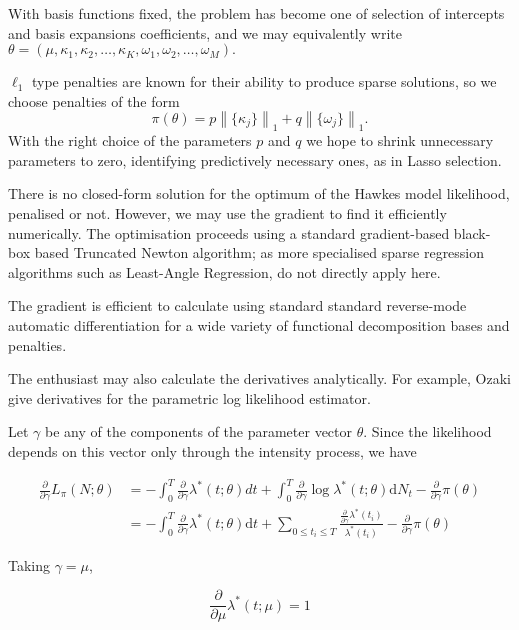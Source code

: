 \documentclass[11pt]{article}
\newcommand{\dd}{\mathrm{d}}
\begin{document}
    With basis functions fixed, the problem has become one of selection of
intercepts and basis expansions coefficients, and we may equivalently
write
\(\theta=(\mu, \kappa_1,\kappa_2,\dots,\kappa_K,\omega_1, \omega_2,\dots,\omega_M).\)

\(\ell_1\) type penalties are known for their ability to produce sparse
solutions, so we choose penalties of the form
\[\pi(\theta)=p\left\|\{\kappa_j\}\right\|_1+q\left\|\{\omega_j\}\right\|_1.\]
With the right choice of the parameters \(p\) and \(q\) we hope to
shrink unnecessary parameters to zero, identifying predictively
necessary ones, as in Lasso selection.

    There is no closed-form solution for the optimum of the Hawkes model
likelihood, penalised or not. However, we may use the gradient to find
it efficiently numerically. The optimisation proceeds using a standard
gradient-based black-box based Truncated Newton algorithm; as more
specialised sparse regression algorithms such as Least-Angle Regression,
do not directly apply here.

The gradient is efficient to calculate using standard standard
reverse-mode automatic differentiation \cite{baydin_automatic_2014} for
a wide variety of functional decomposition bases and penalties.

The enthusiast may also calculate the derivatives analytically. For
example, Ozaki \cite{ozaki_maximum_1979} give derivatives for the
parametric log likelihood estimator.

    Let \(\gamma\) be any of the components of the parameter vector
\(\theta\). Since the likelihood depends on this vector only through the
intensity process, we have

\[\begin{aligned}
{ \scriptstyle \frac{\partial}{\partial\gamma} } L_\pi(N;\theta)&=-\int_0^T{ \scriptstyle \frac{\partial}{\partial\gamma} }\lambda^*(t;\theta)dt + \int_0^T { \scriptstyle \frac{\partial}{\partial\gamma} }\log \lambda^*(t;\theta) \dd N_t -{ \scriptstyle \frac{\partial}{\partial\gamma} }\pi(\theta) \\
&=-\int_0^T{ \scriptstyle \frac{\partial}{\partial\gamma} }\lambda^*(t;\theta)\dd t + \sum_{0\leq t_i\leq T} \frac{{ \scriptstyle \frac{\partial}{\partial\gamma} }\lambda^*(t_i)}{\lambda^*(t_i)} -{ \scriptstyle \frac{\partial}{\partial\gamma} }\pi(\theta)
\end{aligned}
\]

    Taking \(\gamma=\mu\),

\[{ \scriptstyle \frac{\partial}{\partial\mu} }\lambda^*(t;\mu) = 1\]
\end{document}
